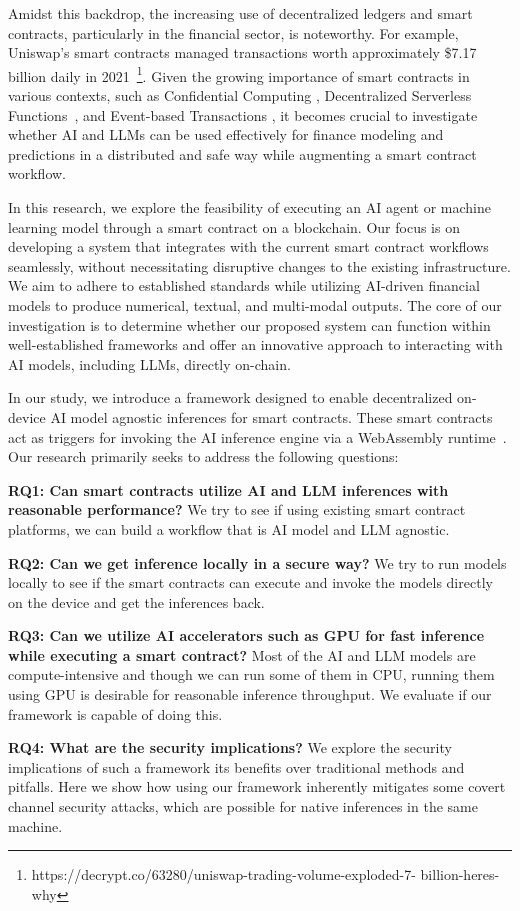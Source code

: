 Amidst this backdrop, the increasing use of decentralized ledgers and smart contracts, particularly in the financial sector, is noteworthy. For example, Uniswap's smart contracts managed transactions worth approximately \$7.17 billion daily in 2021~\footnote{https://decrypt.co/63280/uniswap-trading-volume-exploded-7-
billion-heres-why}. Given the growing importance of smart contracts in various contexts, such as Confidential Computing \cite{10.1145/3505253.3505259,10174906}, Decentralized Serverless Functions~\cite{10174945}, and Event-based Transactions \cite{10.1145/3464298.3493401,9461133}, it becomes crucial to investigate whether AI and LLMs can be used effectively for finance modeling and predictions in a distributed and safe way while augmenting a smart contract workflow. 

In this research, we explore the feasibility of executing an AI agent or machine learning model through a smart contract on a blockchain. Our focus is on developing a system that integrates with the current smart contract workflows seamlessly, without necessitating disruptive changes to the existing infrastructure. We aim to adhere to established standards while utilizing AI-driven financial models to produce numerical, textual, and multi-modal outputs. The core of our investigation is to determine whether our proposed system can function within well-established frameworks and offer an innovative approach to interacting with AI models, including LLMs, directly on-chain.

In our study, we introduce a framework designed to enable decentralized on-device AI model agnostic inferences for smart contracts. These smart contracts act as triggers for invoking the AI inference engine via a WebAssembly runtime~\cite{haas2017bringing}. Our research primarily seeks to address the following questions:


\begin{tcolorbox}[colback=red!5!white,colframe=red!75!black]
  \textbf{RQ1: Can smart contracts utilize AI and LLM inferences with reasonable performance?} We try to see if using existing smart contract platforms, we can build a workflow that is AI model and LLM agnostic. 

\textbf{RQ2: Can we get inference locally in a secure way?} We try to run models locally to see if the smart contracts can execute and invoke the models directly on the device and get the inferences back.

\textbf{RQ3: Can we utilize AI accelerators such as GPU for fast inference while executing a smart contract?} Most of the AI and LLM models are compute-intensive and though we can run some of them in CPU, running them using GPU is desirable for reasonable inference throughput. We evaluate if our framework is capable of doing this.

\textbf{RQ4: What are the security implications?} We explore the security implications of such a framework its benefits over traditional methods and pitfalls. Here we show how using our framework inherently mitigates some covert channel security attacks, which are possible for native inferences in the same machine.
\end{tcolorbox}


